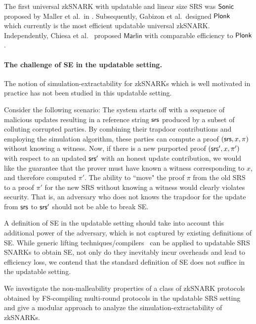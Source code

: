 The first universal zkSNARK with updatable and linear size SRS was
${\textnormal{\textsf{Sonic}}}$ proposed by Maller et al.~in \cite{CCS:MBKM19}. Subsequently, Gabizon et
al.~designed $\textnormal{\textsf{Plonk}}$~\cite{EPRINT:GabWilCio19} which currently is the
most efficient updatable universal zkSNARK. Independently, Chiesa et
al.~\cite{EC:CHMMVW20} proposed $\textsf{Marlin}$ with comparable efficiency to
$\textnormal{\textsf{Plonk}}$.

\paragraph{The challenge of SE in the updatable setting.}

The notion of simulation-extractability for zkSNARKs which is well motivated in practice has not been studied in this updatable setting.

Consider the following scenario: The system starts off with a sequence of malicious updates resulting in a reference string $\mathsf{srs}$ produced by a subset of colluting corrupted parties. By combining their trapdoor contributions and employing the simulation algorithm, these parties can compute a proof $(\mathsf{srs},x,\pi)$ without knowing a witness. Now, if there is a new purported proof $(\mathsf{srs}',x,\pi')$ with respect to an updated $\mathsf{srs}'$ with an honest update contribution, we would like the guarantee that the prover must have known a witness corresponding to $x$, and therefore computed $\pi'$. The ability to ``move" the proof $\pi$ from the old SRS to a proof $\pi'$ for the new SRS without knowing a witness would clearly violates security. That is, an adversary who does not knows the trapdoor for the update from $\mathsf{srs}$ to $\mathsf{srs}'$ should not be able to break SE. %


A definition of SE in the updatable setting should take into account this additional power of the adversary, which is not captured by existing definitions of SE. 
While generic lifting techniques/compilers~\cite{EPRINT:KZMQCP15,CCS:AbdRamSla20} can be applied to updatable SRS SNARKs to obtain SE, not only do they inevitably incur overheads and lead to efficiency loss, we contend that the standard definition of SE does not suffice in the updatable setting.




We investigate the non-malleability properties of a class of zkSNARK protocols obtained by FS-compiling multi-round protocols in the updatable SRS setting and give a modular approach to analyze the simulation-extractability of zkSNARKs.
